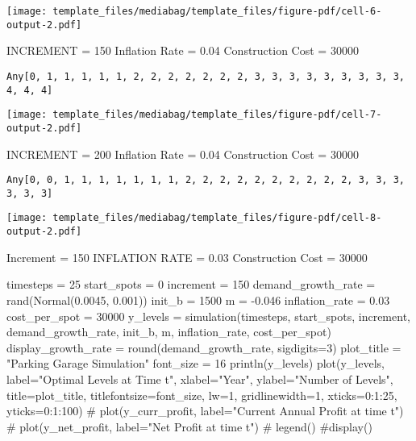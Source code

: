 \documentclass[
  11pt,
]{article}
\newenvironment{Shaded}{\begin{snugshade}}{\end{snugshade}}
\newcommand{\CommentTok}[1]{\textcolor[rgb]{0.37,0.37,0.37}{#1}}
\newcommand{\FloatTok}[1]{\textcolor[rgb]{0.68,0.00,0.00}{#1}}
\newcommand{\FunctionTok}[1]{\textcolor[rgb]{0.28,0.35,0.67}{#1}}
\newcommand{\NormalTok}[1]{\textcolor[rgb]{0.00,0.23,0.31}{#1}}
\newcommand{\OperatorTok}[1]{\textcolor[rgb]{0.37,0.37,0.37}{#1}}
\newcommand{\StringTok}[1]{\textcolor[rgb]{0.13,0.47,0.30}{#1}}
\begin{document}
\texttt{[image: template\_files/mediabag/template\_files/figure-pdf/cell-6-output-2.pdf]}

INCREMENT = 150 Inflation Rate = 0.04 Construction Cost = 30000

\begin{verbatim}
Any[0, 1, 1, 1, 1, 1, 2, 2, 2, 2, 2, 2, 2, 3, 3, 3, 3, 3, 3, 3, 3, 3, 4, 4, 4]
\end{verbatim}

\texttt{[image: template\_files/mediabag/template\_files/figure-pdf/cell-7-output-2.pdf]}

INCREMENT = 200 Inflation Rate = 0.04 Construction Cost = 30000

\begin{verbatim}
Any[0, 0, 1, 1, 1, 1, 1, 1, 1, 2, 2, 2, 2, 2, 2, 2, 2, 2, 2, 3, 3, 3, 3, 3, 3]
\end{verbatim}

\texttt{[image: template\_files/mediabag/template\_files/figure-pdf/cell-8-output-2.pdf]}

Increment = 150 INFLATION RATE = 0.03 Construction Cost = 30000

\begin{Shaded}
\begin{Highlighting}[numbers=left,,]
\NormalTok{timesteps }\OperatorTok{=} \FloatTok{25} 
\NormalTok{start\_spots }\OperatorTok{=} \FloatTok{0}
\NormalTok{increment }\OperatorTok{=} \FloatTok{150}
\NormalTok{demand\_growth\_rate }\OperatorTok{=} \FunctionTok{rand}\NormalTok{(}\FunctionTok{Normal}\NormalTok{(}\FloatTok{0.0045}\NormalTok{, }\FloatTok{0.001}\NormalTok{))}
\NormalTok{init\_b }\OperatorTok{=} \FloatTok{1500}
\NormalTok{m }\OperatorTok{=} \OperatorTok{{-}}\FloatTok{0.046}
\NormalTok{inflation\_rate }\OperatorTok{=} \FloatTok{0.03}
\NormalTok{cost\_per\_spot }\OperatorTok{=} \FloatTok{30000}
\NormalTok{y\_levels }\OperatorTok{=} \FunctionTok{simulation}\NormalTok{(timesteps, start\_spots, increment, demand\_growth\_rate, init\_b, m, inflation\_rate, cost\_per\_spot)}
\NormalTok{display\_growth\_rate }\OperatorTok{=} \FunctionTok{round}\NormalTok{(demand\_growth\_rate, sigdigits}\OperatorTok{=}\FloatTok{3}\NormalTok{)}
\NormalTok{plot\_title }\OperatorTok{=} \StringTok{"Parking Garage Simulation"}
\NormalTok{font\_size }\OperatorTok{=} \FloatTok{16}
\FunctionTok{println}\NormalTok{(y\_levels)}
\FunctionTok{plot}\NormalTok{(y\_levels, label}\OperatorTok{=}\StringTok{"Optimal Levels at Time t"}\NormalTok{, xlabel}\OperatorTok{=}\StringTok{"Year"}\NormalTok{, ylabel}\OperatorTok{=}\StringTok{"Number of Levels"}\NormalTok{,}
\NormalTok{title}\OperatorTok{=}\NormalTok{plot\_title, titlefontsize}\OperatorTok{=}\NormalTok{font\_size, lw}\OperatorTok{=}\FloatTok{1}\NormalTok{, gridlinewidth}\OperatorTok{=}\FloatTok{1}\NormalTok{, xticks}\OperatorTok{=}\FloatTok{0}\OperatorTok{:}\FloatTok{1}\OperatorTok{:}\FloatTok{25}\NormalTok{, yticks}\OperatorTok{=}\FloatTok{0}\OperatorTok{:}\FloatTok{1}\OperatorTok{:}\FloatTok{100}\NormalTok{)}
\CommentTok{\# plot(y\_curr\_profit, label="Current Annual Profit at time t")}
\CommentTok{\# plot(y\_net\_profit, label="Net Profit at time t")}
\CommentTok{\# legend()}
\CommentTok{\#display()}
\end{Highlighting}
\end{Shaded}
\end{document}
